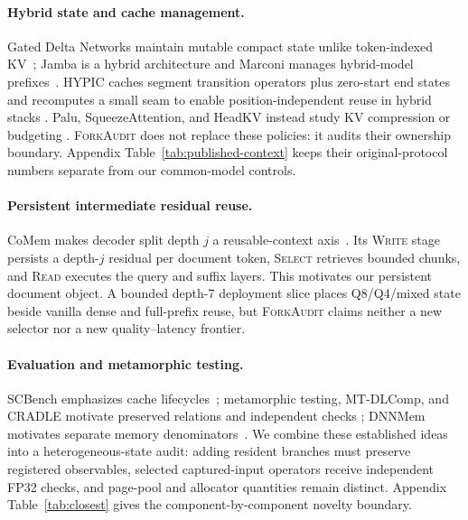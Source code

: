 \documentclass{article}
\newcommand{\method}{\textsc{ForkAudit}}
\begin{document}
\paragraph{Hybrid state and cache management.}
Gated Delta Networks maintain mutable compact state unlike token-indexed
KV~\citep{yang2025gateddeltanet}; Jamba is a hybrid architecture and Marconi
manages hybrid-model prefixes~\citep{lieber2025jamba,pan2025marconi}.  HYPIC
caches segment transition operators plus zero-start end states and recomputes a
small seam to enable position-independent reuse in hybrid stacks
\citep{liu2026hypic}.  Palu,
SqueezeAttention, and HeadKV instead study KV compression or budgeting
\citep{chang2025palu,wang2025squeezeattention,fu2025headkv}.  \method{} does
not replace these policies: it audits their ownership boundary.  Appendix
Table~\ref{tab:published-context} keeps their original-protocol numbers
separate from our common-model controls.

\paragraph{Persistent intermediate residual reuse.}
CoMem makes decoder split depth $j$ a reusable-context
axis~\citep{liu2026comem,liu2026understanding}.
Its \textsc{Write} stage persists a depth-$j$ residual per document token,
\textsc{Select} retrieves bounded chunks, and \textsc{Read} executes the query
and suffix layers.  This motivates our persistent document object.  A bounded
depth-7 deployment slice places Q8/Q4/mixed state beside vanilla dense and
full-prefix reuse, but \method{} claims neither a new selector nor a new
quality--latency frontier.

\paragraph{Evaluation and metamorphic testing.}
SCBench emphasizes cache lifecycles~\citep{li2025scbench}; metamorphic testing,
MT-DLComp, and CRADLE motivate preserved relations and independent checks
\citep{chen2018metamorphic,xiao2022metamorphic,pham2019cradle}; DNNMem motivates
separate memory denominators~\citep{gao2020dnnmem}.  We combine these established
ideas into a heterogeneous-state audit: adding resident branches must preserve
registered observables, selected captured-input operators receive independent
FP32 checks, and page-pool and allocator quantities remain distinct.  Appendix
Table~\ref{tab:closest} gives the component-by-component novelty boundary.
\end{document}
